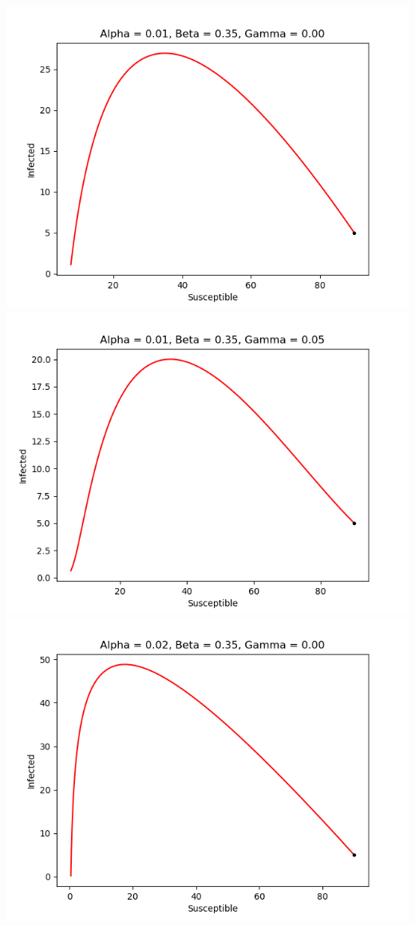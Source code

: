 \includegraphics[scale=0.4]{fig/img/a1_b35_g0.png}
\includegraphics[scale=0.4]{fig/img/a1_b35_g5.png}\\
\includegraphics[scale=0.4]{fig/img/a2_b35_g0.png}
